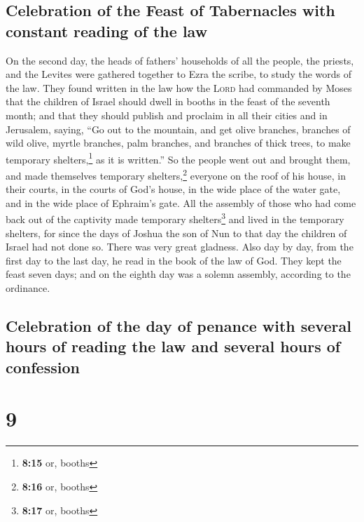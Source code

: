 \hypertarget{celebration-of-the-feast-of-tabernacles-with-constant-reading-of-the-law}{%
\subsection{Celebration of the Feast of Tabernacles with constant
reading of the
law}\label{celebration-of-the-feast-of-tabernacles-with-constant-reading-of-the-law}}

 On the second day, the heads of fathers' households of
all the people, the priests, and the Levites were gathered together to
Ezra the scribe, to study the words of the law.  They
found written in the law how the \textsc{Lord} had commanded by Moses
that the children of Israel should dwell in booths in the feast of the
seventh month;  and that they should publish and proclaim
in all their cities and in Jerusalem, saying, ``Go out to the mountain,
and get olive branches, branches of wild olive, myrtle branches, palm
branches, and branches of thick trees, to make temporary
shelters,\footnote{\textbf{8:15} or, booths} as it is written.''
 So the people went out and brought them, and made
themselves temporary shelters,\footnote{\textbf{8:16} or, booths}
everyone on the roof of his house, in their courts, in the courts of
God's house, in the wide place of the water gate, and in the wide place
of Ephraim's gate.  All the assembly of those who had
come back out of the captivity made temporary shelters\footnote{\textbf{8:17}
  or, booths} and lived in the temporary shelters, for since the days of
Joshua the son of Nun to that day the children of Israel had not done
so. There was very great gladness.  Also day by day, from
the first day to the last day, he read in the book of the law of God.
They kept the feast seven days; and on the eighth day was a solemn
assembly, according to the ordinance.

\hypertarget{celebration-of-the-day-of-penance-with-several-hours-of-reading-the-law-and-several-hours-of-confession}{%
\subsection{Celebration of the day of penance with several hours of
reading the law and several hours of
confession}\label{celebration-of-the-day-of-penance-with-several-hours-of-reading-the-law-and-several-hours-of-confession}}

\hypertarget{section-8}{%
\section{9}\label{section-8}}

